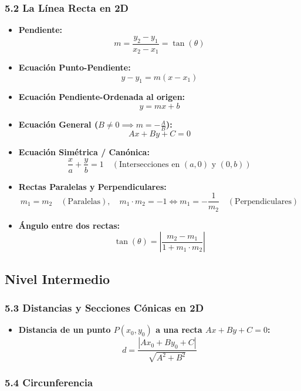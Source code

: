 \documentclass[11pt,a4paper]{article}
\begin{document}
\subsubsection*{5.2 La Línea Recta en 2D}

\begin{itemize}
  \item \textbf{Pendiente:}
  \[
    m = \frac{y_2 - y_1}{x_2 - x_1} = \tan(\theta)
  \]
  \item \textbf{Ecuación Punto-Pendiente:}
  \[
    y - y_1 = m(x - x_1)
  \]
  \item \textbf{Ecuación Pendiente-Ordenada al origen:}
  \[
    y = mx + b
  \]
  \item \textbf{Ecuación General ($B \ne 0 \implies m = -\frac{A}{B}$):}
  \[
    Ax + By + C = 0
  \]
  \item \textbf{Ecuación Simétrica / Canónica:}
  \[
    \frac{x}{a} + \frac{y}{b} = 1 \quad (\text{Intersecciones en } (a,0) \text{ y } (0,b))
  \]
  \item \textbf{Rectas Paralelas y Perpendiculares:}
  \[
    m_1 = m_2 \quad (\text{Paralelas}), \quad m_1 \cdot m_2 = -1 \iff m_1 = -\frac{1}{m_2} \quad (\text{Perpendiculares})
  \]
  \item \textbf{Ángulo entre dos rectas:}
  \[
    \tan(\theta) = \left|\frac{m_2 - m_1}{1 + m_1 \cdot m_2}\right|
  \]
\end{itemize}

\subsection*{Nivel Intermedio}

\subsubsection*{5.3 Distancias y Secciones Cónicas en 2D}

\begin{itemize}
  \item \textbf{Distancia de un punto $P(x_0, y_0)$ a una recta $Ax + By + C = 0$:}
  \[
    d = \frac{|Ax_0 + By_0 + C|}{\sqrt{A^2 + B^2}}
  \]
\end{itemize}

\subsubsection*{5.4 Circunferencia}
\end{document}
